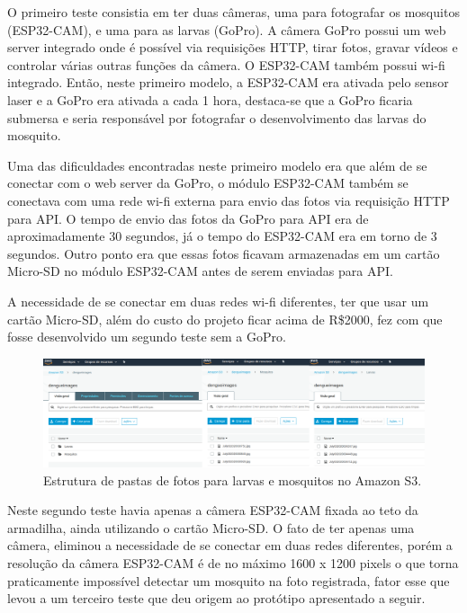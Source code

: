 \documentclass[
	12pt,				%
	openright,			%
	oneside,			%
	a4paper,			%
	chapter=TITLE,		%
	english,			%
	brazil				%
	]{abntex2}
\begin{document}
O primeiro teste consistia em ter duas câmeras, uma para fotografar 
os mosquitos (ESP32-CAM), e uma para as larvas (GoPro). A câmera GoPro possui um web server integrado onde é possível via requisições HTTP, tirar fotos, gravar vídeos e controlar 
várias outras funções da câmera. O ESP32-CAM também possui wi-fi integrado. Então, neste primeiro modelo, a ESP32-CAM era ativada pelo sensor laser e a GoPro era ativada a cada 1 hora, 
destaca-se que a GoPro ficaria submersa e seria responsável por fotografar o desenvolvimento das larvas do mosquito. 

Uma das dificuldades encontradas neste primeiro modelo era que além de se conectar com o web server da GoPro, 
o módulo ESP32-CAM também se conectava com uma rede wi-fi externa para envio das fotos via requisição HTTP para API. 
O tempo de envio das fotos da GoPro para API era de aproximadamente 30 segundos, já o tempo do ESP32-CAM era em torno de 3 segundos. 
Outro ponto era que essas fotos ficavam armazenadas em um cartão Micro-SD no módulo ESP32-CAM antes de serem enviadas para API.

A necessidade de se conectar em duas redes wi-fi diferentes, 
ter que usar um cartão Micro-SD, além do custo do projeto ficar acima de R\$2000, fez com que fosse desenvolvido um segundo teste sem a GoPro.

\begin{figure}[H]
    \centering
    \includegraphics[scale=0.2]{imagens/larvasMosquitos.png}
    \caption{Estrutura de pastas de fotos para larvas e mosquitos no Amazon S3.}
        \label{fig:larvasMosquitos}
    \end{figure}

Neste segundo teste havia apenas a câmera ESP32-CAM fixada ao teto da armadilha, ainda utilizando o cartão Micro-SD. O fato de ter apenas uma câmera, eliminou a necessidade 
de se conectar em duas redes diferentes, porém a resolução da câmera ESP32-CAM é de no máximo 1600 x 1200 pixels o que torna praticamente impossível detectar um mosquito na 
foto registrada, fator esse que levou a um terceiro teste que deu origem ao protótipo apresentado a seguir.
\end{document}
